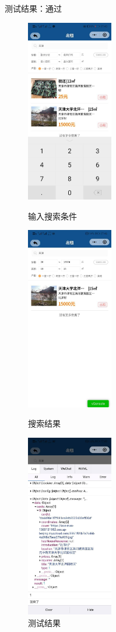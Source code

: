 测试结果：通过
\newpage
\begin{figure}[htbp]
    \centering
    \begin{minipage}[t]{0.32\textwidth}
        \centering
        \includegraphics[width=3.8cm,height=8cm]{test/image/test22.png} 
       \caption{输入搜索条件} 
        \end{minipage}
    \begin{minipage}[t]{0.32\textwidth}
    \centering
    \includegraphics[width=3.8cm,height=8cm]{test/image/test23.png} 
   \caption{搜索结果} 
    \end{minipage}
    \begin{minipage}[t]{0.32\textwidth}
    \centering
    \includegraphics[width=3.8cm,height=8cm]{test/image/test24.png}
    \caption{测试结果}
    \end{minipage}
    \end{figure}
   
